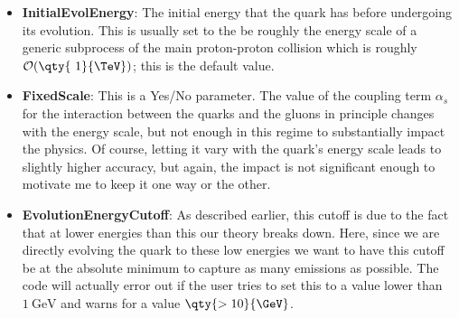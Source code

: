 \begin{itemize}
\item \textbf{InitialEvolEnergy}: The initial energy that the quark has before undergoing its evolution. This is usually set to the be roughly the energy scale of a generic subprocess of the main proton-proton collision which is roughly $\mathcal{O}(\qty{~1}{\TeV})$; this is the default value.
\item \textbf{FixedScale}: This is a Yes/No parameter. The value of the coupling term $\alpha_s$ for the interaction between the quarks and the gluons in principle changes with the energy scale, but not enough in this regime to substantially impact the physics. Of course, letting it vary with the quark's energy scale leads to slightly higher accuracy, but again, the impact is not significant enough to motivate me to keep it one way or the other.
\item \textbf{EvolutionEnergyCutoff}: As described earlier, this cutoff is due to the fact that at lower energies than this our theory breaks down. Here, since we are directly evolving the quark to these low energies we want to have this cutoff be at the absolute minimum to capture as many emissions as possible. The code will actually error out if the user tries to set this to a value lower than $\qty{1}{\GeV}$ and warns for a value $\qty{>10}{\GeV}$.
\end{itemize}








